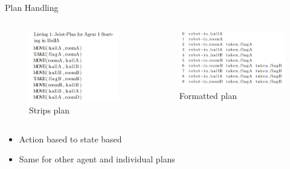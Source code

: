 \documentclass{bredelebeamer}
\begin{document}
\begin{frame}{Plan Handling}

\begin{columns}
\begin{column}{0.4\linewidth}
\begin{figure}[h!]
\centering
  \includegraphics[width = \linewidth]{../article/img/joinPlanA1.png}
  \caption{Strips plan}
  \label{fig:plan2}
\end{figure}
\end{column}


\begin{column}{0.6\linewidth}
\begin{figure}[h!]
\centering
  \includegraphics[width = \linewidth]{../article/img/listingFormattedJoinAgent1.png}
  \caption{Formatted plan}
  \label{fig:plan2}
\end{figure}
\end{column}

\end{columns}

\begin{block}{}
\begin{itemize}
\item Action based to state based
\item Same for other agent and individual plans
\end{itemize}
\end{block}

\end{frame}
\end{document}

